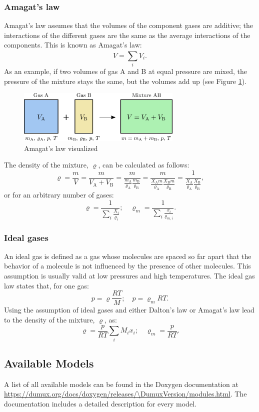 \subsubsection{Amagat's law}
Amagat's law assumes that the volumes of the component gases are additive; the interactions of the different gases are the same as the average interactions of the components. This is known as Amagat's law:
%
\begin{equation}
V = \sum_{i}^{}V_i.
\end{equation}
%
As an example, if two volumes of gas A and B at equal pressure are mixed, the pressure of the mixture stays the same, but the volumes add up (see Figure \ref{fig:dalton2}).
%
\begin{figure}[ht]
  \centering
  \includegraphics[width=0.7\textwidth]{png/dalton2.png}
  \caption{Amagat's law visualized}
  \label{fig:dalton2}
\end{figure}
%
The density of the mixture, $\varrho$, can be calculated as follows:
\begin{equation}
\varrho = \frac{m}{V} = \frac{m}{V_\mathrm{A} + V_\mathrm{B}} = \frac{m}{\frac{m_\mathrm{A}}{\varrho_\mathrm{A}} \frac{m_\mathrm{B}}{\varrho_\mathrm{B}}} =
\frac{m}{\frac{X_\mathrm{A} m}{\varrho_\mathrm{A}} \frac{X_\mathrm{B} m}{\varrho_\mathrm{B}}} = \frac{1}{\frac{X_\mathrm{A}}{\varrho_\mathrm{A}} \frac{X_\mathrm{B}}{\varrho_\mathrm{B}}},
\end{equation}
%
or for an arbitrary number of gases:
%
\begin{equation}
\varrho = \frac{1}{\sum_{i}^{}\frac{X_i}{\varrho_i}}  ; \quad  \varrho_m = \frac{1}{\sum_{i}^{}\frac{x_i}{\varrho_{m,i}}}.
\end{equation}
%
\subsubsection{Ideal gases}
An ideal gas is defined as a gas whose molecules are spaced so far apart that the behavior of a molecule is not influenced by the presence of other molecules.
This assumption is usually valid at low pressures and high temperatures. The ideal gas law states that, for one gas:
%
\begin{equation}
p = \varrho \frac{RT}{M} ; \quad p= \varrho_m RT.
\end{equation}
%
Using the assumption of ideal gases and either Dalton's law or Amagat's law lead to the density of the mixture, $\varrho$, as:
%
\begin{equation}
\varrho = \frac{p}{RT} \sum_{i}^{}M_i x_i ; \quad \varrho_m = \frac{p}{RT}.
\end{equation}
%
\subsection{Available Models}
A list of all available models can be found
in the Doxygen documentation at
\url{https://dumux.org/docs/doxygen/releases/\DumuxVersion/modules.html}.
The documentation includes a detailed description for every model.
